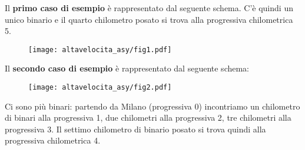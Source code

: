 \Examples
\begin{example}
%
%
\end{example}

\Explanation

Il \textbf{primo caso di esempio} è rappresentato dal seguente schema. C'è quindi un unico binario e il quarto chilometro posato si trova alla progressiva chilometrica 5.
\begin{figure}[H]
\centering\texttt{[image: altavelocita\_asy/fig1.pdf]}
\end{figure}

Il \textbf{secondo caso di esempio} è rappresentato dal seguente schema:
\begin{figure}[H]
\centering\texttt{[image: altavelocita\_asy/fig2.pdf]}
\end{figure}
Ci sono più binari: partendo da Milano (progressiva 0) incontriamo un chilometro di binari alla progressiva 1, due chilometri alla progressiva 2, tre chilometri alla progressiva 3. Il settimo chilometro di binario posato si trova quindi alla progressiva chilometrica 4.
